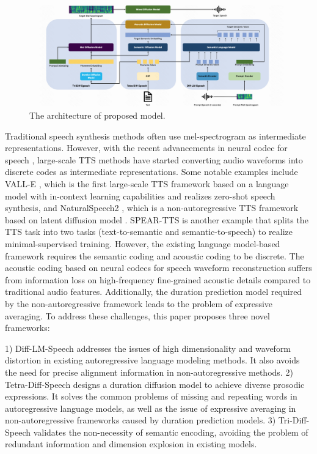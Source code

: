 \documentclass{article}
\begin{document}
\begin{figure}[t]
 \centering
 \includegraphics[width=\linewidth]{model.png}
 \vspace{-20pt}
 \captionsetup{belowskip=-20pt}
 \caption{The architecture of proposed model.}
 \label{fig:proposed_model}
\end{figure}
Traditional speech synthesis methods often use mel-spectrogram as intermediate representations. However, with the recent advancements in neural codec for speech \cite{baevski2020wav2vec, Hsu2021HuBERTSS, Defossez2022HighFN, Zeghidour2022SoundStreamAE}, large-scale TTS methods have started converting audio waveforms into discrete codes as intermediate representations. Some notable examples include VALL-E \cite{wang2023neural}, which is the first large-scale TTS framework based on a language model with in-context learning capabilities and realizes zero-shot speech synthesis, and NaturalSpeech2 \cite{shen2023naturalspeech}, which is a non-autoregressive TTS framework based on latent diffusion model \cite{rombach2022high}. SPEAR-TTS \cite{zhang2023speak} is another example that splits the TTS task into two tasks (text-to-semantic and semantic-to-speech) to realize minimal-supervised training. However, the existing language model-based framework requires the semantic coding and acoustic coding to be discrete. The acoustic coding based on neural codecs for speech waveform reconstruction suffers from information loss on high-frequency fine-grained acoustic details compared to traditional audio features. Additionally, the duration prediction model required by the non-autoregressive framework leads to the problem of expressive averaging. To address these challenges, this paper proposes three novel frameworks:

1) Diff-LM-Speech addresses the issues of high dimensionality and waveform distortion in existing autoregressive language modeling methods. It also avoids the need for precise alignment information in non-autoregressive methods. 
2) Tetra-Diff-Speech designs a duration diffusion model to achieve diverse prosodic expressions. It solves the common problems of missing and repeating words in autoregressive language models, as well as the issue of expressive averaging in non-autoregressive frameworks caused by duration prediction models.
3) Tri-Diff-Speech validates the non-necessity of semantic encoding, avoiding the problem of redundant information and dimension explosion in existing models.
\end{document}
